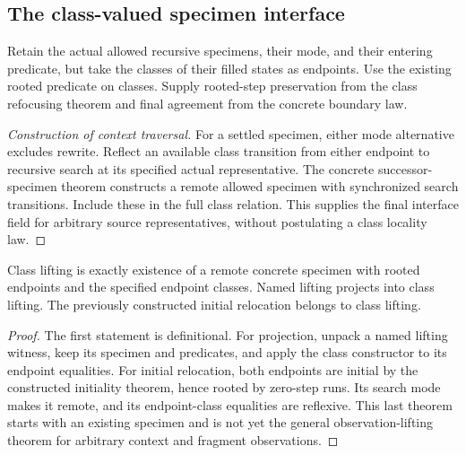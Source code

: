 \subsection{The class-valued specimen interface}
\begin{definition}
Retain the actual allowed recursive specimens, their mode, and their entering
predicate, but take the classes of their filled states as endpoints. Use the
existing rooted predicate on classes. Supply rooted-step preservation from
the class refocusing theorem and final agreement from the concrete boundary
law.
\end{definition}
\begin{proof}[Construction of context traversal]
For a settled specimen, either mode alternative excludes rewrite. Reflect an
available class transition from either endpoint to recursive search at its
specified actual representative. The concrete successor-specimen theorem
constructs a remote allowed specimen with synchronized search transitions.
Include these in the full class relation. This supplies the final interface
field for arbitrary source representatives, without postulating a class
locality law.
\end{proof}


\begin{lemma}
Class lifting is exactly existence of a remote concrete specimen with rooted
endpoints and the specified endpoint classes. Named lifting projects into
class lifting. The previously constructed initial relocation belongs to
class lifting.
\end{lemma}
\begin{proof}
The first statement is definitional. For projection, unpack a named lifting
witness, keep its specimen and predicates, and apply the class constructor
to its endpoint equalities. For initial relocation, both endpoints are initial
by the constructed initiality theorem, hence rooted by zero-step runs.
Its search mode makes it remote, and its endpoint-class equalities are reflexive.
This last theorem starts with an existing specimen and is not yet the general
observation-lifting theorem for arbitrary context and fragment observations.
\end{proof}


